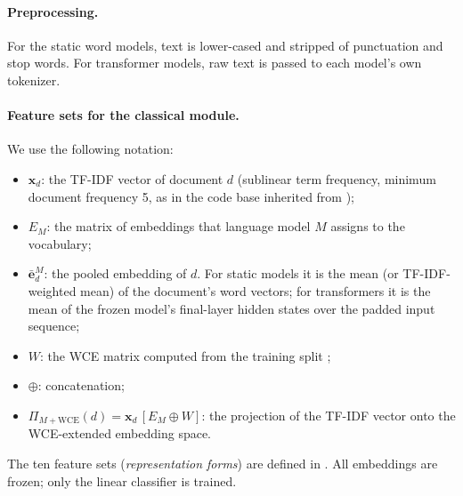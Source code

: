 \documentclass{ijis}
\begin{document}
\paragraph{Preprocessing.} For the static word models, text is lower-cased and stripped of punctuation and stop words. For transformer models, raw text is passed to each model's own tokenizer.

\paragraph{Feature sets for the classical module.} We use the following notation:
\begin{itemize}
\setlength\itemsep{1pt}
\item $\mathbf{x}_d$: the TF-IDF vector of document $d$ (sublinear term frequency, minimum document frequency 5, as in the code base inherited from \cite{moreo2021});
\item $E_M$: the matrix of embeddings that language model $M$ assigns to the vocabulary;
\item $\bar{\mathbf{e}}^{M}_d$: the pooled embedding of $d$. For static models it is the mean (or TF-IDF-weighted mean) of the document's word vectors; for transformers it is the mean of the frozen model's final-layer hidden states over the padded input sequence;
\item $W$: the WCE matrix computed from the training split \cite{moreo2021};
\item $\oplus$: concatenation;
\item $\Pi_{M+\mathrm{WCE}}(d) = \mathbf{x}_d\,[E_M \oplus W]$: the projection of the TF-IDF vector onto the WCE-extended embedding space.
\end{itemize}
The ten feature sets (\emph{representation forms}) are defined in . All embeddings are frozen; only the linear classifier is trained.
\end{document}
